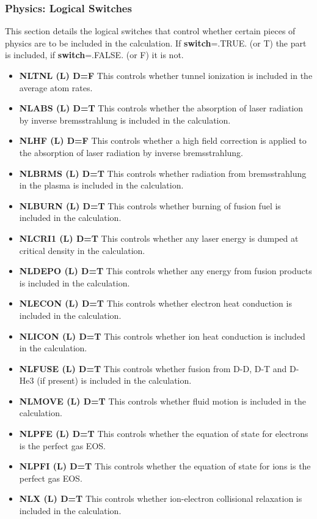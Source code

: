 \subsubsection{\bf Physics: Logical Switches}
\newline
This section details the logical switches that control whether
certain pieces of physics are to be included in the calculation.
If {\bf switch}=.TRUE. (or T) the part is included,
if {\bf switch}=.FALSE. (or F) it is not.
\begin{itemize}
\item {\bf NLTNL (L) D=F}
This controls whether
tunnel ionization 
is included in the average atom rates.
\item {\bf NLABS (L) D=T}
This controls whether
the absorption of laser radiation by inverse bremsstrahlung
is included in the calculation.
\item {\bf NLHF (L) D=F}
This controls whether a high field correction is applied
to the absorption of laser radiation by inverse bremsstrahlung.
\item {\bf NLBRMS (L) D=T}
This controls whether
radiation from bremsstrahlung in the plasma
is included in the calculation.
\item {\bf NLBURN (L) D=T}
This controls whether
burning of fusion fuel
is included in the calculation.
\item {\bf NLCRI1 (L) D=T}
This controls whether
any laser energy is dumped at critical density
in the calculation.
\item {\bf NLDEPO (L) D=T}
This controls whether
any energy from fusion products
is included in the calculation.
\item {\bf NLECON (L) D=T}
This controls whether
electron heat conduction
is included in the calculation.
\item {\bf NLICON (L) D=T}
This controls whether
ion heat conduction
is included in the calculation.
\item {\bf NLFUSE (L) D=T}
This controls whether
fusion from D-D, D-T and D-He3 (if present)
is included in the calculation.
\item {\bf NLMOVE (L) D=T}
This controls whether
fluid motion
is included in the calculation.
\item {\bf NLPFE (L) D=T}
This controls whether
the equation of state for electrons is the perfect gas EOS.
\item {\bf NLPFI (L) D=T}
This controls whether
the equation of state for ions is the perfect gas EOS.
\item {\bf NLX (L) D=T}
This controls whether
ion-electron collisional relaxation
is included in the calculation.
\end{itemize}
\vspace*{5mm}



